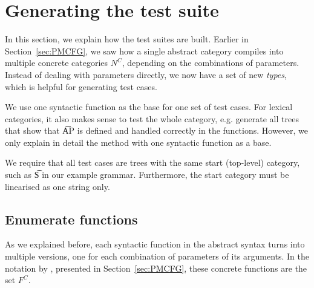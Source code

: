


\section{Generating the test suite}
\label{sec:testing}

In this section, we explain how the test suites are built.  Earlier in
Section~\ref{sec:PMCFG}, we saw how a single abstract category
compiles into multiple concrete categories $N^C$, depending on the
combinations of parameters. Instead of dealing with parameters
directly, we now have a set of new \emph{types}, which is helpful for
generating test cases.

We use one syntactic function as the base for one set of test
cases. For lexical categories, it also makes sense to test the whole
category, e.g. generate all trees that show that \t{AP} is defined and
handled correctly in the functions. However, we only explain in detail
the method with one syntactic function as a base.

We require that all test cases are trees with the same start
(top-level) category, such as \t{S} in our example
grammar. Furthermore, the start category must be linearised as
one string only.



\subsection{Enumerate functions} As we explained before, each
syntactic function in the abstract syntax turns into multiple
versions, one for each combination of parameters of its arguments.  In
the notation by \citet{angelov2010phd}, presented in
Section~\ref{sec:PMCFG}, these concrete functions are the set $F^C$.

